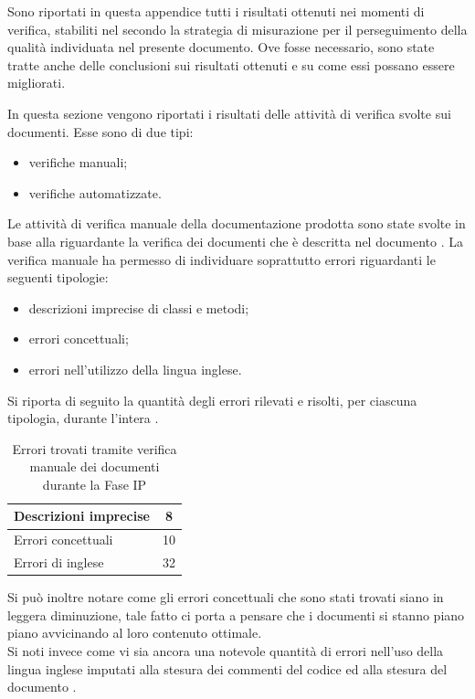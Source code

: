 	Sono riportati in questa appendice tutti i risultati ottenuti nei momenti di verifica, stabiliti nel  secondo la strategia di misurazione per il perseguimento della qualità individuata nel presente documento. Ove fosse necessario, sono state tratte anche delle conclusioni sui risultati ottenuti e su come essi possano essere migliorati.

			In questa sezione vengono riportati i risultati delle attività di verifica svolte sui documenti. Esse sono di due tipi:
			\begin{itemize}
				\item verifiche manuali;
				\item verifiche automatizzate.
			\end{itemize}
				Le attività di verifica manuale della documentazione prodotta sono state svolte in base alla  riguardante la verifica dei documenti che è descritta nel documento .
				La verifica manuale ha permesso di individuare soprattutto errori riguardanti le seguenti tipologie:
				\begin{itemize}
					\item descrizioni imprecise di classi e metodi;
					\item errori concettuali;
					\item errori nell'utilizzo della lingua inglese.
				\end{itemize}
				Si riporta di seguito la quantità degli errori rilevati e risolti, per ciascuna tipologia, durante l'intera .
				\begin{table}[H]
					\centering
						\begin{tabu}{| l | c |}
							\hline
								Descrizioni imprecise	&	8\\ \hline
								Errori concettuali	&	10\\ \hline
								Errori di inglese  &  32\\ \hline
						\end{tabu}
						\caption{Errori trovati tramite verifica manuale dei documenti durante la Fase IP}
				\end{table}
				Si può inoltre notare come gli errori concettuali che sono stati trovati siano in leggera diminuzione, tale fatto ci porta a pensare che i documenti si stanno piano piano avvicinando al loro contenuto ottimale.\\
				Si noti invece come vi sia ancora una notevole quantità di errori nell'uso della lingua inglese imputati alla stesura dei commenti del codice ed alla stesura del documento .

